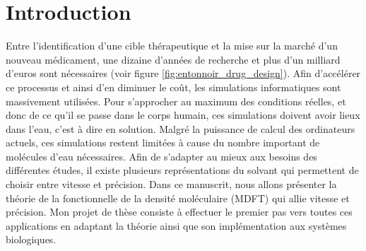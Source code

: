 \chapter{Introduction}
\label{chap:introduction}

Entre l'identification d'une cible thérapeutique et la mise sur la marché d'un nouveau médicament, une dizaine d'années de recherche et plus d'un milliard d’euros sont nécessaires\cite{DiMasi_price_2003, Siddiqui_high_2012} (voir figure \ref{fig:entonnoir_drug_design}). Afin d'accélérer ce processus et ainsi d'en diminuer le coût, les simulations informatiques sont massivement utilisées. Pour s'approcher au maximum des conditions réelles, et donc de ce qu'il se passe dans le corps humain, ces simulations doivent avoir lieux dans l'eau, c'est à dire en solution. Malgré la puissance de calcul des ordinateurs actuels, ces simulations restent limitées à cause du nombre important de molécules d'eau nécessaires. Afin de s'adapter au mieux aux besoins des différentes études, il existe plusieurs représentations du solvant qui permettent de choisir entre vitesse et précision. Dans ce manuscrit, nous allons présenter la théorie de la fonctionnelle de la densité moléculaire (MDFT) qui allie vitesse et précision. Mon projet de thèse consiste à effectuer le premier pas vers toutes ces applications en adaptant la théorie ainsi que son implémentation aux systèmes biologiques.

